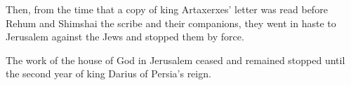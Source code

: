 \begin{inparaenum}
     Then, from the time that a copy of king Artaxerxes' letter was read before Rehum and Shimshai the scribe and their companions, they went in haste to Jerusalem against the Jews and stopped them by force.%
    
     The work of the house of God in Jerusalem ceased and remained stopped until the second year of king Darius of Persia's reign.%
\end{inparaenum}
